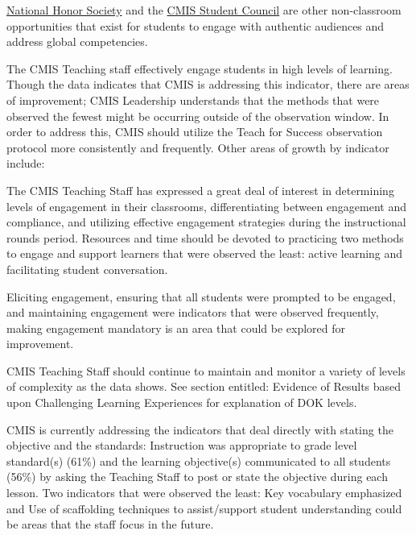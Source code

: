 \begin{findings}
\href{https://drive.google.com/drive/folders/0B0TYmzaZNi3fMGp2X0xiMk52alk?usp=sharing}{National Honor Society} and the \href{https://drive.google.com/drive/folders/0B0TYmzaZNi3fSVVEd0VWTkcwVU0?usp=sharing}{CMIS Student Council} are other non-classroom opportunities that exist for students to engage with authentic audiences and address global competencies. 

 
The CMIS Teaching staff effectively engage students in high levels of learning. Though the data indicates that CMIS is addressing this indicator, there are areas of improvement; CMIS Leadership understands that the methods that were observed the fewest might be occurring outside of the observation window. In order to address this, CMIS should utilize the Teach for Success observation protocol more consistently and frequently. Other areas of growth by indicator include: 


The CMIS Teaching Staff has expressed a great deal of interest in determining levels of engagement in their classrooms, differentiating between engagement and compliance, and utilizing effective engagement strategies during the instructional rounds period. Resources and time should be devoted to practicing two methods to engage and support learners that were observed the least: active learning and facilitating student conversation. 


Eliciting engagement, ensuring that all students were prompted to be engaged, and maintaining engagement were indicators that were observed frequently, making engagement mandatory is an area that could be explored for improvement. 


CMIS Teaching Staff should continue to maintain and monitor a variety of levels of complexity as the data shows. See section entitled: Evidence of Results based upon Challenging Learning Experiences for explanation of DOK levels. 


CMIS is currently addressing the indicators that deal directly with stating the objective and the standards: Instruction was appropriate to grade level standard(s) (61\%) and the learning objective(s) communicated to all students (56\%) by asking the Teaching Staff to post or state the objective during each lesson. Two indicators that were observed the least: 
Key vocabulary emphasized and Use of scaffolding techniques to assist/support student understanding could be areas that the staff focus in the future. 


\end{findings}
